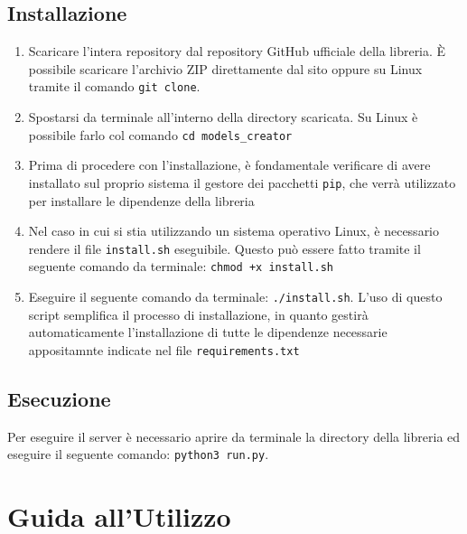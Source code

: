 \documentclass{rapportECL}
\newcommand{\rootDirectory}{models\_creator}
\begin{document}
\section*{Installazione}
\begin{enumerate}
  \item Scaricare l'intera repository dal repository GitHub ufficiale della libreria. 
  È possibile scaricare l'archivio ZIP direttamente dal sito oppure su Linux tramite il comando \texttt{git clone}.
  \item Spostarsi da terminale all'interno della directory scaricata. Su Linux è possibile farlo col comando \texttt{cd \rootDirectory}
  \item Prima di procedere con l'installazione, è fondamentale verificare di avere installato sul proprio sistema il gestore dei pacchetti 
  \texttt{pip}, che verrà utilizzato per installare le dipendenze della libreria
  \item Nel caso in cui si stia utilizzando un sistema operativo Linux, è necessario rendere il file \texttt{install.sh} eseguibile. 
  Questo può essere fatto tramite il seguente comando da terminale: \texttt{chmod +x install.sh}
  \item Eseguire il seguente comando da terminale: \texttt{./install.sh}. L'uso di questo script semplifica il processo di installazione, 
  in quanto gestirà automaticamente l'installazione di tutte le dipendenze necessarie appositamnte indicate nel file \texttt{requirements.txt}
\end{enumerate}

\section*{Esecuzione}
Per eseguire il server è necessario aprire da terminale la directory della libreria ed eseguire
il seguente comando: \texttt{python3 run.py}.



\chapter{Guida all'Utilizzo}
\label{cha:guida}
\end{document}
